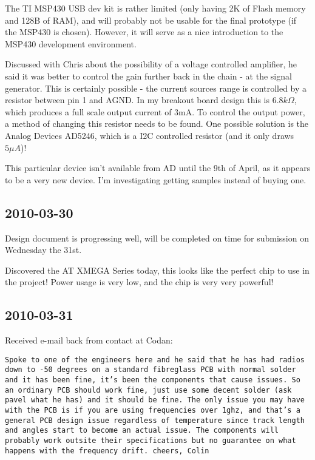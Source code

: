 \documentclass[a4paper,10pt]{article}
\begin{document}
The TI MSP430 USB dev kit is rather limited (only having 2K of Flash memory and 128B of RAM), and will probably not be usable for the final prototype (if the MSP430 is chosen). However, it will serve as a nice introduction to the MSP430 development environment.

Discussed with Chris about the possibility of a voltage controlled amplifier, he said it was better to control the gain further back in the chain - at the signal generator. This is certainly possible - the current sources range is controlled by a resistor between pin 1 and AGND. In my breakout board design this is $6.8k\Omega$, which produces a full scale output current of 3mA. To control the output power, a method of changing this resistor needs to be found. One possible solution is the Analog Devices AD5246, which is a I2C controlled resistor (and it only draws $5\mu A$)!

This particular device isn't available from AD until the 9th of April, as it appears to be a very new device. I'm investigating getting samples instead of buying one.

\subsection{2010-03-30}
Design document is progressing well, will be completed on time for submission on Wednesday the 31st.

Discovered the AT XMEGA Series today, this looks like the perfect chip to use in the project! Power usage is very low, and the chip is very very powerful!

\subsection{2010-03-31}
Received e-mail back from contact at Codan:

\texttt{Spoke to one of the engineers here and he said that he has had radios down to -50 degrees on a standard fibreglass PCB with normal solder and it has been fine, it's been the components that cause issues. So an ordinary PCB should work fine, just use some decent solder (ask pavel what he has) and it should be fine.
The only issue you may have with the PCB is if you are using frequencies over 1ghz, and that's a general PCB design issue regardless of temperature since track length and angles start to become an actual issue.
The components will probably work outsite their specifications but no guarantee on what happens with the frequency drift.
cheers,
Colin
}
\end{document}
